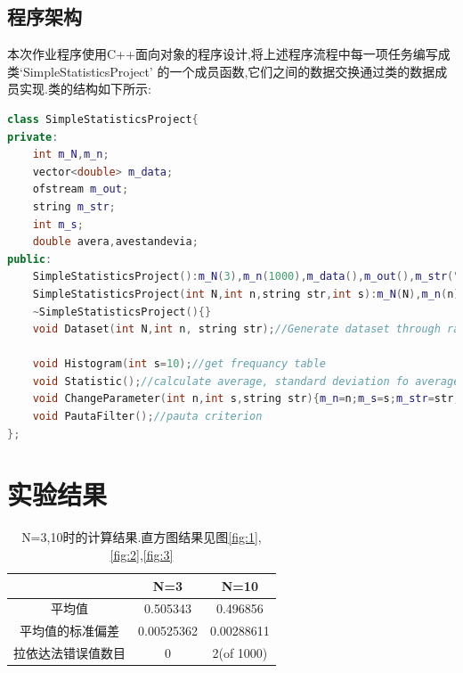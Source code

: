 \documentclass[10pt,a4paper]{article}
\begin{document}
\subsection{程序架构}
本次作业程序使用C++面向对象的程序设计,将上述程序流程中每一项任务编写成类`SimpleStatisticsProject' 的一个成员函数,它们之间的数据交换通过类的数据成员实现.类的结构如下所示:

\begin{lstlisting}[language=C++]
class SimpleStatisticsProject{
private:
    int m_N,m_n;
    vector<double> m_data;
    ofstream m_out;
    string m_str;
    int m_s;
    double avera,avestandevia;
public:
    SimpleStatisticsProject():m_N(3),m_n(1000),m_data(),m_out(),m_str("result"),m_s(10),avera(0),avestandevia(0){}
    SimpleStatisticsProject(int N,int n,string str,int s):m_N(N),m_n(n),m_data(m_n),m_out(),m_str(str),m_s(s),avera(0),avestandevia(0){}
    ~SimpleStatisticsProject(){}
    void Dataset(int N,int n, string str);//Generate dataset through random numbers. When you want N change and generate new dataset, just call this function!

    void Histogram(int s=10);//get frequancy table
    void Statistic();//calculate average, standard deviation fo average
    void ChangeParameter(int n,int s,string str){m_n=n;m_s=s;m_str=str;}
    void PautaFilter();//pauta criterion
};
\end{lstlisting}
\section{实验结果}
\begin{table}[H]
\centering
\begin{tabular}{|c|c|c|}
\hline 
& N=3&N=10 \\ 
\hline 
平均值&0.505343&0.496856\\
平均值的标准偏差&0.00525362&0.00288611\\
拉依达法错误值数目&0&2(of 1000)\\
\hline
\end{tabular}
\caption{N=3,10时的计算结果.直方图结果见图\ref{fig:1},\ref{fig:2},\ref{fig:3}}
\end{table}
\end{document}
